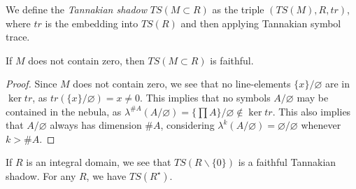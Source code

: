 \begin{definition}
  We define the \emph{Tannakian shadow} $TS(M \subset R)$ as the triple $(TS(M), R, tr)$, where $tr$ is the embedding into $TS(R)$ and then applying Tannakian symbol trace. 
\end{definition}

\begin{proposition}
  If $M$ does not contain zero, then $TS(M \subset R)$ is faithful. 
\end{proposition}

\begin{proof}
  Since $M$ does not contain zero, we see that no line-elements $\{x\}/\varnothing$ are in $\ker tr$, as $tr(\{x\}/\varnothing) = x \ne 0$. This implies that no symbols $A/\varnothing$ may be contained in the nebula, as $\lambda^{\#A}(A/\varnothing) = \{\prod A\}/\varnothing \notin \ker tr$. This also implies that $A/\varnothing$ always has dimension $\#A$, considering $\lambda^k(A/\varnothing) = \varnothing/\varnothing$ whenever $k > \#A$.
  
  
\end{proof}

\begin{example}
  If $R$ is an integral domain, we see that $TS(R \backslash \{0\})$ is a faithful Tannakian shadow. For any $R$, we have $TS(R^{\star})$.
\end{example}
